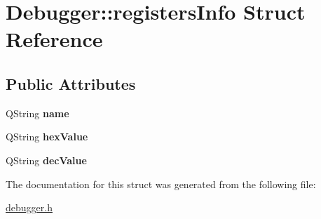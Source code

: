 \hypertarget{struct_debugger_1_1registers_info}{}\section{Debugger\+:\+:registers\+Info Struct Reference}
\label{struct_debugger_1_1registers_info}
\subsection*{Public Attributes}
\begin{DoxyCompactItemize}
\item 
\hypertarget{struct_debugger_1_1registers_info_ae3b2f5a8a3067a3c918b49bf1199cd3d}{}Q\+String {\bfseries name}\label{struct_debugger_1_1registers_info_ae3b2f5a8a3067a3c918b49bf1199cd3d}

\item 
\hypertarget{struct_debugger_1_1registers_info_a339a32649de1b03fcde0a970c44f8d58}{}Q\+String {\bfseries hex\+Value}\label{struct_debugger_1_1registers_info_a339a32649de1b03fcde0a970c44f8d58}

\item 
\hypertarget{struct_debugger_1_1registers_info_a9d6dbc77e7e94f55dc89c72798f70d2f}{}Q\+String {\bfseries dec\+Value}\label{struct_debugger_1_1registers_info_a9d6dbc77e7e94f55dc89c72798f70d2f}

\end{DoxyCompactItemize}


The documentation for this struct was generated from the following file\+:\begin{DoxyCompactItemize}
\item 
\hyperlink{debugger_8h}{debugger.\+h}\end{DoxyCompactItemize}

